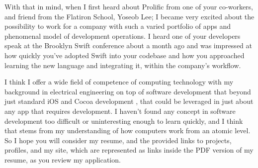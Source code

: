 \documentclass[11pt, letter]{awesome-cv}
\begin{document}
\begin{cvletter}
With that in mind, when I first heard about Prolific from one of your co-workers, and friend from the Flatiron School, Yoseob Lee; I became very excited about the possibility to work for a company with such a varied portfolio of apps and phenomenal model of development operations. I heard one of your developers speak at the Brooklyn Swift conference about a month ago and was impressed at how quickly you’ve adopted Swift into your codebase and how you approached learning the new language and integrating it, within the company's workflow.

I think I offer a wide field of competence of computing technology with my background in electrical engineering on top of software development that beyond just standard iOS and Cocoa development , that could be leveraged in just about any app that requires development. I haven’t found any concept in software development too difficult or uninteresting enough to learn quickly, and I think that stems from my understanding of how computers work from an atomic level. So I hope you will consider my resume, and the provided links to projects, profiles, and my site, which are represented as links inside the PDF version of my resume, as you review my application.




\end{cvletter}


\makeletterclosing
\end{document}
